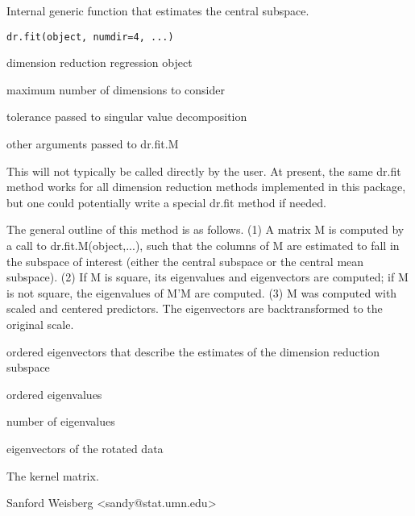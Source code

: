 \begin{Description}\relax
Internal generic function that estimates the central subspace.
\end{Description}
\begin{Usage}
\begin{verbatim}
dr.fit(object, numdir=4, ...)

\end{verbatim}
\end{Usage}
\begin{Arguments}
\begin{ldescription}
\item[\code{object}] dimension reduction regression object 
\item[\code{numdir}] maximum number of dimensions to consider 
\item[\code{tol}] tolerance passed to singular value decomposition 
\item[\code{...}] other arguments passed to dr.fit.M 
\end{ldescription}
\end{Arguments}
\begin{Details}\relax
This will not
typically be called directly by the user.  At present, the same dr.fit method works 
for all dimension reduction methods implemented in this package, but one could
potentially write a special dr.fit method if needed.

The general outline of this method is as follows.  (1)  A matrix M is computed
by a call to dr.fit.M(object,...), such that the columns of M are estimated to 
fall in the subspace of interest (either the central subspace or the central mean
subspace). (2)  If M is square, its eigenvalues and eigenvectors are computed; if
M is not square, the eigenvalues of M'M are computed. (3) M was computed with scaled
and centered predictors.  The eigenvectors are backtransformed to the original
scale.
\end{Details}
\begin{Value}
\begin{ldescription}
\item[\code{evectors }] ordered eigenvectors that describe the estimates of the 
dimension reduction subspace
\item[\code{evalues }] ordered eigenvalues
\item[\code{numdir}] number of eigenvalues
\item[\code{raw.evectors}] eigenvectors of the rotated data
\item[\code{M}] The kernel matrix.
\end{ldescription}
\end{Value}
\begin{Author}\relax
Sanford Weisberg <sandy@stat.umn.edu>
\end{Author}
\begin{SeeAlso}\relax
{}
\end{SeeAlso}

